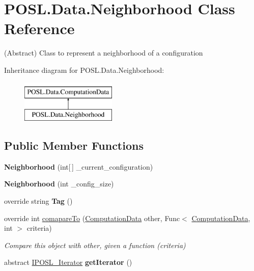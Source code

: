 \hypertarget{classPOSL_1_1Data_1_1Neighborhood}{}\section{P\+O\+S\+L.\+Data.\+Neighborhood Class Reference}
\label{classPOSL_1_1Data_1_1Neighborhood}


(Abstract) Class to represent a neighborhood of a configuration  


Inheritance diagram for P\+O\+S\+L.\+Data.\+Neighborhood\+:\begin{figure}[H]
\begin{center}
\leavevmode
\includegraphics[height=2.000000cm]{classPOSL_1_1Data_1_1Neighborhood}
\end{center}
\end{figure}
\subsection*{Public Member Functions}
\begin{DoxyCompactItemize}
\item 
\mbox{\label{classPOSL_1_1Data_1_1Neighborhood_a360ba755eb5e9d86a56723bb478ab469}} 
{\bfseries Neighborhood} (int\mbox{[}$\,$\mbox{]} \+\_\+current\+\_\+configuration)
\item 
\mbox{\label{classPOSL_1_1Data_1_1Neighborhood_a06bd81429e435cc7c434b29d62b8f50d}} 
{\bfseries Neighborhood} (int \+\_\+config\+\_\+size)
\item 
\mbox{\label{classPOSL_1_1Data_1_1Neighborhood_a74e095bec02148e5816c8e11eacba9d5}} 
override string {\bfseries Tag} ()
\item 
override int \hyperlink{classPOSL_1_1Data_1_1Neighborhood_aa7014a3cbaf532f49d89468c20b7c269}{comapare\+To} (\hyperlink{classPOSL_1_1Data_1_1ComputationData}{Computation\+Data} other, Func$<$ \hyperlink{classPOSL_1_1Data_1_1ComputationData}{Computation\+Data}, int $>$ criteria)
\begin{DoxyCompactList}\small\item\em Compare this object with other, given a function (criteria) \end{DoxyCompactList}\item 
\mbox{\label{classPOSL_1_1Data_1_1Neighborhood_a3bf4058bac77b7a30623de0621536cb3}} 
abstract \hyperlink{interfacePOSL_1_1Data_1_1IPOSL__Iterator}{I\+P\+O\+S\+L\+\_\+\+Iterator} {\bfseries get\+Iterator} ()
\end{DoxyCompactItemize}
